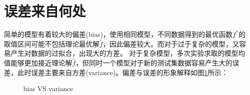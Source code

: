 \section{误差来自何处}

简单的模型有着较大的偏差(bias)，使用相同模型，不同数据得到的最优函数$f^*$的取值区间可能不包括理论最优解$\hat{f}$，因此偏差较大。而对于过于复杂的模型，又容易产生对数据的过拟合，出现大的方差。
对于复杂模型，多次实验求取的模型均值能够更加接近理论解$\hat{f}$，但同时一个模型对于新的测试集数据容易产生大的误差，此时误差主要来自方差(variance)。偏差与误差的形象解释如图\ref{fig:bias_and_variance}所示：

\begin{figure}
	\centering

	{\qquad
	}
	\caption{bias VS variance}
	\label{fig:bias_and_variance}
\end{figure}



